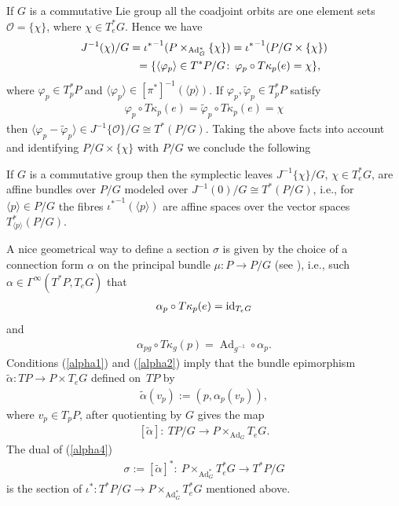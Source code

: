 \documentclass[pdftex]{sigma}
\renewcommand{\O}{\mathcal{O}}
\renewcommand{\to}{\rightarrow}
\DeclareMathOperator{\Ad}{Ad}
\newcommand{\id}{\text{\upshape id}}
\numberwithin{equation}{section}
\begin{document}
 If $G$ is a commutative Lie group all the coadjoint orbits are one element sets $\O=\{\chi\}$, where $\chi\in T^*_eG$. Hence we have
\begin{gather*}
J^{-1}(\chi)/G ={\iota^*}^{-1}(P\times _{\Ad^*_G}\{\chi\})={\iota^*}^{-1}(P/G\times\{\chi\}) \nonumber\\
\hphantom{J^{-1}(\chi)/G}{} =\{\langle\varphi_p\rangle\in T^*P/G\colon \, \varphi_p\circ T\kappa_p(e)=\chi\},\nonumber
\end{gather*}
 where $\varphi_p\in T_p^*P$ and $\langle\varphi_p\rangle\in [\pi^*]^{-1}(\langle p \rangle)$. If $\varphi_p, \tilde\varphi_p\in T_p^*P$ satisfy
 \begin{gather*} \varphi_p\circ T\kappa_p(e)=\tilde\varphi_p\circ T\kappa_p(e)=\chi \end{gather*}
 then $\langle \varphi_p - \tilde\varphi_p\rangle \in J_{}^{-1}\{\O\}/G\cong T^*(P/G)$. Taking the above facts into account and identifying $P/G\times \{\chi\}$ with $P/G$ we conclude the following
 \begin{Remark} If $G$ is a commutative group then the symplectic leaves $J_{}^{-1}\{\chi\}/G$, $\chi\in T^*_eG$, are af\/f\/ine bundles over $P/G$ modeled over $J_{}^{-1}(0)/G\cong T^*(P/G)$, i.e., for $\langle p\rangle\in P/G$ the f\/ibres ${\iota_{}^*}^{-1}(\langle p\rangle)$ are af\/f\/ine spaces over the vector spaces $T^*_{\langle p\rangle}(P/G)$.
 \end{Remark}

A nice geometrical way to def\/ine a section $\sigma$ is given by the choice of a connection form $\alpha$ on the principal bundle $\mu\colon P\to P/G$ (see \cite{Weinstein:1977}), i.e., such $\alpha\in \Gamma^\infty(T^*P, T_eG)$ that
 \begin{gather}\label{alpha1} \alpha_p\circ T\kappa_p(e)=\id_{T_eG}\end{gather}
 and
 \begin{gather}\label{alpha2} \alpha_{pg}\circ T\kappa_g(p)=\Ad_{g^{-1}}\circ\alpha_p.\end{gather}
 Conditions (\ref{alpha1}) and (\ref{alpha2}) imply that the bundle epimorphism $\tilde\alpha\colon TP\to P\times T_eG$ def\/ined on~$TP$ by
 \begin{gather*}%
 \tilde\alpha(v_p):=(p,\alpha_p(v_p)),\end{gather*}
 where $v_p\in T_pP$, after quotienting by $G$ gives the map
 \begin{gather}\label{alpha4} [\tilde\alpha]\colon \ TP/G\to P\times _{\Ad_G}T_eG.\end{gather}
 The dual of (\ref{alpha4})
 \begin{gather*}%
 \sigma:=[\tilde\alpha]^*\colon \ P\times _{\Ad_G^*}T^*_eG\to T^*P/G\end{gather*}
 is the section of $\iota^*\colon T^*P/G\to P\times _{\Ad_G^*}T^*_eG$ mentioned above.
\end{document}

